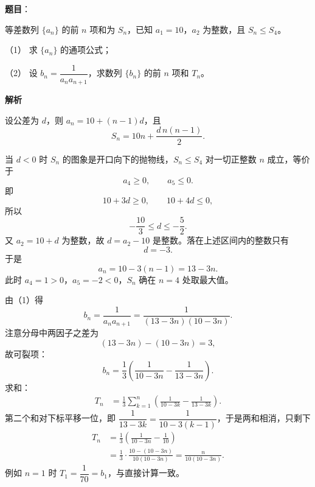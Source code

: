 \begin{answer}

\textbf{题目}：

等差数列 $\{a_n\}$ 的前 $n$ 项和为 $S_n$，已知 $a_1=10$，$a_2$ 为整数，且 $S_n\leqslant S_4$。

（1） 求 $\{a_n\}$ 的通项公式；

（2） 设 $b_n=\dfrac{1}{a_na_{n+1}}$，求数列 $\{b_n\}$ 的前 $n$ 项和 $T_n$。

\textbf{解析}

设公差为 $d$，则 $a_n=10+(n-1)d$，且
\nopagebreak[4]
\[S_n=10n+\frac{d\,n(n-1)}{2}.\]


当 $d<0$ 时 $S_n$ 的图象是开口向下的抛物线，$S_n\leqslant S_4$ 对一切正整数 $n$ 成立，等价于
\nopagebreak[4]
\[a_4\geqslant0,\qquad a_5\leqslant0.\]
即
\nopagebreak[4]
\[10+3d\geqslant0,\qquad 10+4d\leqslant0,\]
所以
\nopagebreak[4]
\[-\frac{10}{3}\leqslant d\leqslant-\frac52.\]
又 $a_2=10+d$ 为整数，故 $d=a_2-10$ 是整数。落在上述区间内的整数只有
\nopagebreak[4]
\[d=-3.\]
于是
\nopagebreak[4]
\[a_n=10-3(n-1)=13-3n.\]
此时 $a_4=1>0$，$a_5=-2<0$，$S_n$ 确在 $n=4$ 处取最大值。


由（1）得
\nopagebreak[4]
\[b_n=\frac{1}{a_na_{n+1}}=\frac{1}{(13-3n)(10-3n)}.\]
注意分母中两因子之差为
\nopagebreak[4]
\[(13-3n)-(10-3n)=3,\]
故可裂项：
\nopagebreak[4]
\[b_n=\frac13\left(\frac{1}{10-3n}-\frac{1}{13-3n}\right).\]
求和：
\nopagebreak[4]
\[\begin{aligned}
T_n&=\frac13\sum_{k=1}^{n}\left(\frac{1}{10-3k}-\frac{1}{13-3k}\right).
\end{aligned}\]
第二个和对下标平移一位，即 $\dfrac{1}{13-3k}=\dfrac{1}{10-3(k-1)}$，于是两和相消，只剩下
\nopagebreak[4]
\[\begin{aligned}
T_n&=\frac13\left(\frac{1}{10-3n}-\frac{1}{10}\right)\\
&=\frac13\cdot\frac{10-(10-3n)}{10(10-3n)}
=\frac{n}{10(10-3n)}.
\end{aligned}\]
例如 $n=1$ 时 $T_1=\dfrac{1}{70}=b_1$，与直接计算一致。



\end{answer}
